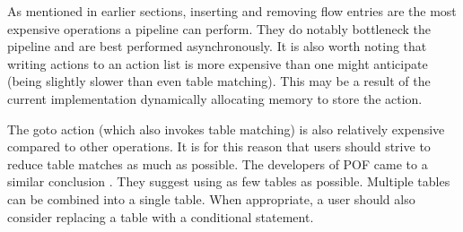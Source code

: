As mentioned in earlier sections, inserting and removing flow entries are the most expensive operations a pipeline can perform. They do notably bottleneck the pipeline and are best performed asynchronously.
It is also worth noting that writing actions to an action list is more expensive than one might anticipate (being slightly slower than even table matching). This may be a result of the current implementation dynamically allocating memory to store the action.

The goto action (which also invokes table matching) is also relatively expensive compared to other operations. It is for this reason that users should strive to reduce table matches as much as possible. The developers of POF came to a similar conclusion \cite{pof_impl}. They suggest using as few tables as possible. Multiple tables can be combined into a single table. When appropriate, a user should also consider replacing a table with a conditional statement.
